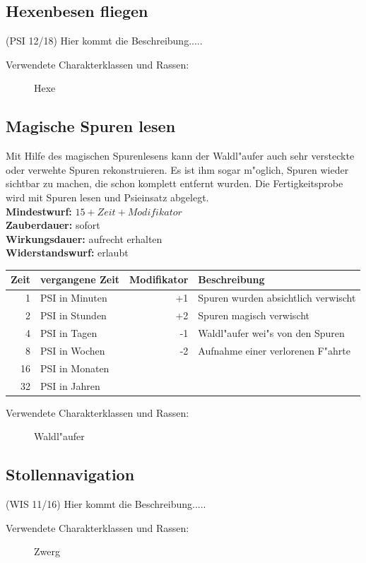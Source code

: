 \subsection{Hexenbesen fliegen}
\par (PSI 12/18) Hier kommt die Beschreibung.....
\begin{description}
\item [Verwendete Charakterklassen und Rassen:] Hexe
\end{description}

\subsection{Magische Spuren lesen}
\par Mit Hilfe des magischen Spurenlesens kann der Waldl"aufer auch sehr versteckte oder verwehte Spuren 
rekonstruieren. Es ist ihm sogar m"oglich, Spuren wieder sichtbar zu machen, die schon komplett entfernt 
wurden. Die Fertigkeitsprobe wird mit Spuren lesen und
Psieinsatz abgelegt.\\
\textbf{Mindestwurf:} $ 15+Zeit+Modifikator $\\
\textbf{Zauberdauer:} sofort\\
\textbf{Wirkungsdauer:} aufrecht erhalten\\
\textbf{Widerstandswurf:} erlaubt\\
\par \begin{tabular}{r|lr|l}
Zeit & vergangene Zeit & Modifikator & Beschreibung\\
\hline
1 & PSI in Minuten & +1 & Spuren wurden absichtlich verwischt\\
2 & PSI in Stunden & +2 & Spuren magisch verwischt\\
4 & PSI in Tagen   & -1 & Waldl"aufer wei"s von den Spuren\\
8 & PSI in Wochen  & -2 & Aufnahme einer verlorenen F"ahrte\\
16 & PSI in Monaten\\
32 & PSI in Jahren\\
\end{tabular}
\begin{description}
\item [Verwendete Charakterklassen und Rassen:] Waldl"aufer
\end{description}

\subsection{Stollennavigation}
\par (WIS 11/16) Hier kommt die Beschreibung.....
\begin{description}
\item [Verwendete Charakterklassen und Rassen:] Zwerg
\end{description}

